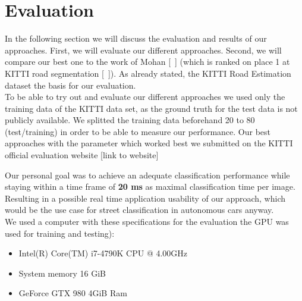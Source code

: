 
\section{Evaluation}\label{sec:evaluation}

In the following section we will discuss the evaluation and results of our approaches. First, we will evaluate our different approaches. Second, we will compare our best one to the work of Mohan [~\cite{Tarel2009}]  (which is ranked on place 1 at KITTI road segmentation [~\cite{Tarel2009}]).
As already stated, the KITTI Road Estimation dataset the basis for our evaluation.\\
To be able to try out and evaluate our different approaches we used only the training data of the KITTI data set, as the ground truth for the test data is not publicly available. We splitted the training data beforehand 20 to 80 (test/training) in order to be able to measure our performance. 
Our best approaches with the parameter which worked best we submitted on the KITTI official evaluation website [link to website]


Our personal goal was to achieve an adequate classification performance while staying within a time frame of \textbf{20 ms} as maximal classification time per image. Resulting in a possible real time application usability of our approach, which would be the use case for street classification in autonomous cars anyway.\\

We used a computer with these specifications for the evaluation the GPU was used for training and testing):
\begin{itemize}
\item Intel(R) Core(TM) i7-4790K CPU @ 4.00GHz
\item System memory 16 GiB
\item GeForce GTX 980 4GiB Ram
\end{itemize}

